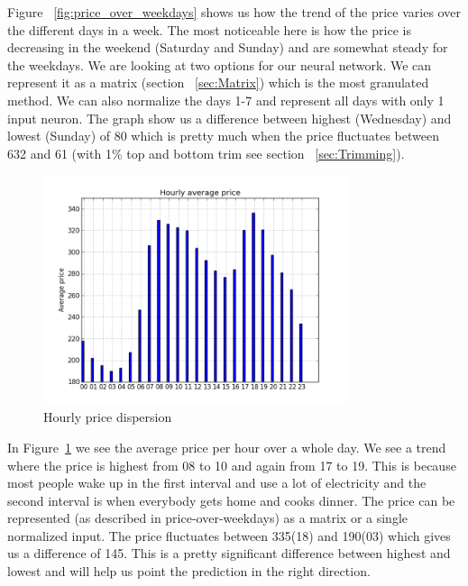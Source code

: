 Figure ~\ref{fig:price_over_weekdays} shows us how the trend of the price varies over the different days in a week. The most noticeable here is how the price is decreasing in the weekend (Saturday and Sunday) and are somewhat steady for the weekdays. We are looking at two options for our neural network. We can represent it as a matrix (section ~\ref{sec:Matrix}) which is the most granulated method. We can also normalize the days 1-7 and represent all days with only 1 input neuron.
The graph show us a difference between highest (Wednesday) and lowest (Sunday) of 80 which is pretty much when the price fluctuates between 632 and 61 (with 1\% top and bottom trim see section ~\ref{sec:Trimming}).

\begin{figure}[H]
\centering
\includegraphics[width=0.8\textwidth ]{billeder/energy_price_plots/price_per_hour.png}
\caption{Hourly price dispersion}
\label{fig:price_per_hour}
\end{figure}

In Figure~\ref{fig:price_per_hour} we see the average price per hour over a whole day. We see a trend where the price is highest from 08 to 10 and again from 17 to 19. This is because most people wake up in the first interval and use a lot of electricity and the second interval is when everybody gets home and cooks dinner. The price can be represented (as described in price-over-weekdays) as a matrix or a single normalized input. The price fluctuates between 335(18) and 190(03) which gives us a difference of 145. This is a pretty significant difference between highest and lowest and will help us point the prediction in the right direction.

